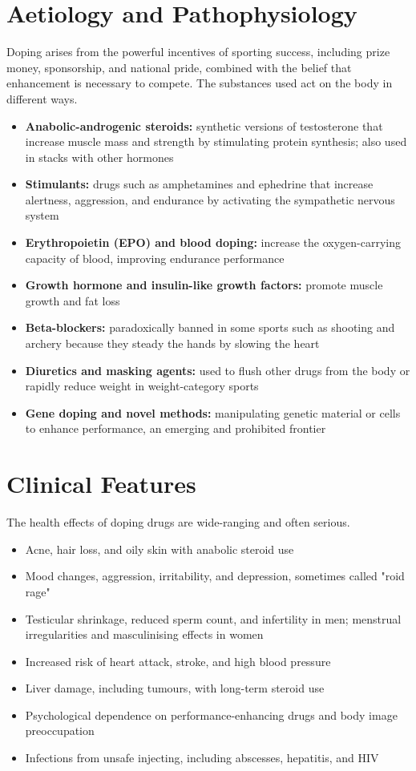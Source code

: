 \section*{Aetiology and Pathophysiology}
Doping arises from the powerful incentives of sporting success, including prize money, sponsorship, and national pride, combined with the belief that enhancement is necessary to compete. The substances used act on the body in different ways.
\begin{itemize}
    \item \textbf{Anabolic-androgenic steroids:} synthetic versions of testosterone that increase muscle mass and strength by stimulating protein synthesis; also used in stacks with other hormones
    \item \textbf{Stimulants:} drugs such as amphetamines and ephedrine that increase alertness, aggression, and endurance by activating the sympathetic nervous system
    \item \textbf{Erythropoietin (EPO) and blood doping:} increase the oxygen-carrying capacity of blood, improving endurance performance
    \item \textbf{Growth hormone and insulin-like growth factors:} promote muscle growth and fat loss
    \item \textbf{Beta-blockers:} paradoxically banned in some sports such as shooting and archery because they steady the hands by slowing the heart
    \item \textbf{Diuretics and masking agents:} used to flush other drugs from the body or rapidly reduce weight in weight-category sports
    \item \textbf{Gene doping and novel methods:} manipulating genetic material or cells to enhance performance, an emerging and prohibited frontier
\end{itemize}

\section*{Clinical Features}
The health effects of doping drugs are wide-ranging and often serious.
\begin{itemize}
    \item Acne, hair loss, and oily skin with anabolic steroid use
    \item Mood changes, aggression, irritability, and depression, sometimes called "roid rage"
    \item Testicular shrinkage, reduced sperm count, and infertility in men; menstrual irregularities and masculinising effects in women
    \item Increased risk of heart attack, stroke, and high blood pressure
    \item Liver damage, including tumours, with long-term steroid use
    \item Psychological dependence on performance-enhancing drugs and body image preoccupation
    \item Infections from unsafe injecting, including abscesses, hepatitis, and HIV
\end{itemize}

